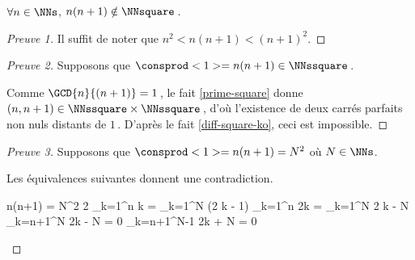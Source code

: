 \begin{fact} \label{case-2}
	 $\forall n \in \NNs$, $n(n+1) \notin \NNsquare$\,.
\end{fact}




\begin{proof}[Preuve 1]
	Il suffit de noter que $n^2 < n(n+1) < (n+1)^2$.
\end{proof}




\begin{proof}[Preuve 2]
    Supposons que $\consprod<1> = n(n+1) \in \NNssquare$\,.
    
    \smallskip
    
    Comme $\GCD{n}{(n + 1)} = 1$\,, le fait \ref{prime-square} donne $(n, n + 1) \in \NNssquare \times \NNssquare$\,, d'où l'existence de deux carrés parfaits non nuls distants de $1$\,.
    D'après le fait \ref{diff-square-ko}, ceci est impossible.
\end{proof}




\begin{proof}[Preuve 3]
	Supposons que $\consprod<1> = n(n+1) = N^2$ où $N \in \NNs$.
     
    \smallskip
    
    Les équivalences suivantes donnent une contradiction.
	
	\medskip
	
	\begin{stepcalc}[style = ar*, ope = \iff]
		n(n+1) = N^2
		2 \dsum_{k=1}^{n} k = \dsum_{k=1}^{N} (2 k - 1)
	\explnext{}
		\dsum_{k=1}^{n} 2k = \dsum_{k=1}^{N} 2 k - N
		\dsum_{k=n+1}^{N} 2k - N = 0
		\dsum_{k=n+1}^{N-1} 2k + N = 0
	\end{stepcalc}

	\vspace{-2ex}	
	\leavevmode
\end{proof}
